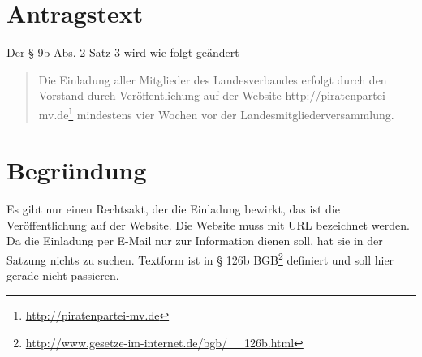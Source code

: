 \section{Antragstext}

Der § 9b Abs. 2 Satz 3 wird wie folgt geändert

\begin{quote}
Die Einladung aller Mitglieder des Landesverbandes erfolgt durch den Vorstand durch Veröffentlichung auf der Website http://piratenpartei-mv.de\footnote{\url{http://piratenpartei-mv.de}} mindestens vier Wochen vor der Landesmitgliederversammlung.

\end{quote}
\section{Begründung}

Es gibt nur einen Rechtsakt, der die Einladung bewirkt, das ist die Veröffentlichung auf der Website. Die Website muss mit URL bezeichnet werden. Da die Einladung per E-Mail nur zur Information dienen soll, hat sie in der Satzung nichts zu suchen. Textform ist in § 126b BGB\footnote{\url{http://www.gesetze-im-internet.de/bgb/\_\_126b.html}} definiert und soll hier gerade nicht passieren.
